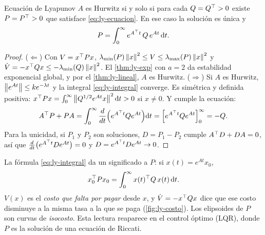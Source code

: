 \begin{teorema}[label=thm:ly-ecuacion]{Ecuación de Lyapunov \citep[Teo.~4.6]{Kha02}}
$A$ es Hurwitz si y solo si para cada $Q=Q^{\top}>0$ existe $P=P^{\top}>0$ que satisface \eqref{eq:ly-ecuacion}. En ese caso la solución es única y
\begin{equation}
  P=\int_0^\infty e^{A^{\top} t}\,Q\,e^{At}\,\mathrm{d} t .
  \label{eq:ly-integral}
\end{equation}
\end{teorema}

\begin{proof}
($\Leftarrow$) Con $V=x^{\top} Px$, $\lambda_{\min}(P)\left\lVert x\right\rVert^2\le V\le\lambda_{\max}(P)\left\lVert x\right\rVert^2$ y $\dot V=-x^{\top} Qx\le-\lambda_{\min}(Q)\left\lVert x\right\rVert^2$. El \cref{thm:ly-exp} con $a=2$ da estabilidad exponencial global, y por el \cref{thm:ly-lineal}, $A$ es Hurwitz.
($\Rightarrow$) Si $A$ es Hurwitz, $\left\lVert e^{At}\right\rVert\le ke^{-\lambda t}$ y la integral \eqref{eq:ly-integral} converge. Es simétrica y definida positiva: $x^{\top} Px=\int_0^\infty\left\lVert Q^{1/2}e^{At}x\right\rVert^2\mathrm{d} t>0$ si $x\neq0$. Y cumple la ecuación:
\[
  A^{\top} P+PA=\int_0^\infty\frac{d}{dt}\Bigl(e^{A^{\top} t}Qe^{At}\Bigr)\mathrm{d} t=\Bigl[e^{A^{\top} t}Qe^{At}\Bigr]_0^\infty=-Q .
\]
Para la unicidad, si $P_1$ y $P_2$ son soluciones, $D=P_1-P_2$ cumple $A^{\top} D+DA=0$, así que $\frac{d}{dt}\bigl(e^{A^{\top} t}De^{At}\bigr)=0$ y $D=e^{A^{\top} t}De^{At}\to0$.
\end{proof}

La fórmula \eqref{eq:ly-integral} da un significado a $P$: si $x(t)=e^{At}x_0$,
\begin{equation}
  x_0^{\top} Px_0=\int_0^\infty x(t)^{\top} Q\,x(t)\,\mathrm{d} t .
  \label{eq:ly-costo}
\end{equation}
$V(x)$ es el \emph{costo que falta por pagar} desde $x$, y $\dot V=-x^{\top} Qx$ dice que ese costo disminuye a la misma tasa a la que se paga (\cref{fig:ly-costo}). Los elipsoides de $P$ son curvas de \emph{isocosto}. Esta lectura reaparece en el control óptimo (LQR), donde $P$ es la solución de una ecuación de Riccati.

